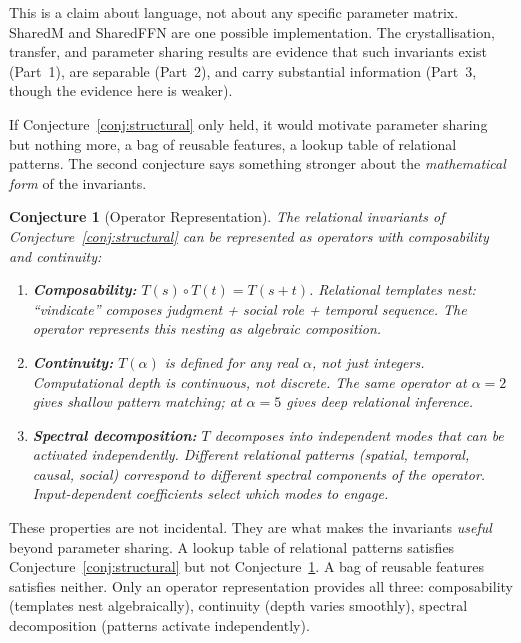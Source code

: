 \documentclass[11pt, a4paper]{article}
\theoremstyle{plain}
\newtheorem{conjecture}{Conjecture}
\theoremstyle{definition}
\theoremstyle{remark}
\begin{document}
\noindent This is a claim about language, not about any specific parameter matrix.
SharedM and SharedFFN are one possible implementation.
The crystallisation, transfer, and parameter sharing results are evidence that such invariants exist (Part~1), are separable (Part~2), and carry substantial information (Part~3, though the evidence here is weaker).

If Conjecture~\ref{conj:structural} only held, it would motivate parameter sharing but nothing more, a bag of reusable features, a lookup table of relational patterns.
The second conjecture says something stronger about the \emph{mathematical form} of the invariants.

\begin{conjecture}[Operator Representation]
\label{conj:operator}
The relational invariants of Conjecture~\ref{conj:structural} can be represented as operators with composability and continuity:
\begin{enumerate}[nosep]
\item \textbf{Composability:} $T(s) \circ T(t) = T(s+t)$.
      Relational templates nest: ``vindicate'' composes judgment + social role + temporal sequence.
      The operator represents this nesting as algebraic composition.
\item \textbf{Continuity:} $T(\alpha)$ is defined for any real $\alpha$, not just integers.
      Computational depth is continuous, not discrete.
      The same operator at $\alpha = 2$ gives shallow pattern matching; at $\alpha = 5$ gives deep relational inference.
\item \textbf{Spectral decomposition:} $T$ decomposes into independent modes that can be activated independently.
      Different relational patterns (spatial, temporal, causal, social) correspond to different spectral components of the operator.
      Input-dependent coefficients select which modes to engage.
\end{enumerate}
\end{conjecture}

\noindent These properties are not incidental.
They are what makes the invariants \emph{useful} beyond parameter sharing.
A lookup table of relational patterns satisfies Conjecture~\ref{conj:structural} but not Conjecture~\ref{conj:operator}.
A bag of reusable features satisfies neither.
Only an operator representation provides all three: composability (templates nest algebraically), continuity (depth varies smoothly), spectral decomposition (patterns activate independently).
\end{document}
